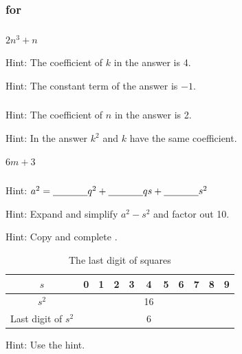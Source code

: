 \subsubsection{\answers for  \subpolys}

\subsubsection*{ \answers}

\begin{apart}
    \item $2n^3+n$
    \item Hint: The coefficient of $k$ in the answer is 4.
    \item Hint: The constant term of the answer is $-1$.
\end{apart}

\subsubsection*{ \answers}
\begin{apart}
    \item Hint: The coefficient of $n$ in the answer is 2.
    \item Hint: In the answer $k^2$ and $k$ have the same coefficient.
    \item $6m+3$
\end{apart}

\subsubsection*{ \answers}
\begin{apart}
    \item Hint: $a^2=\underline{\hspace{0.5in}}q^2 + \underline{\hspace{0.5in}}qs + \underline{\hspace{0.5in}}s^2$
    \item Hint: Expand and simplify $a^2-s^2$ and factor out 10.
    \item Hint: Copy and complete .
        \begin{table}[hbtp]
            \centering
            \begin{tabular}{c |c|c|c |c|c|c |c|c|c |c}
                 $s$ & 0 & 1 & 2 & 3 & 4 & 5 & 6 & 7 & 8 & 9 \\ \hline
                 $s^2$ &&&&& 16 &&&&  \\ \hline
                 Last digit of $s^2$ &&&&& 6 &&&&  \\
            \end{tabular}
            \caption{The last digit of squares}
            \label{table_last_digit_sq}
        \end{table}
    \item Hint: Use the hint.
\end{apart}

